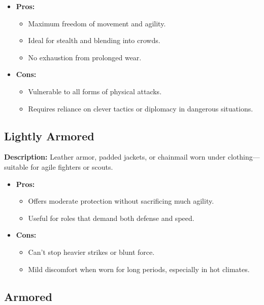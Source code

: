 \documentclass[12pt]{book}  %
\begin{document}
\begin{itemize}
    \item \textbf{Pros:}
    \begin{itemize}
        \item Maximum freedom of movement and agility.
        \item Ideal for stealth and blending into crowds.
        \item No exhaustion from prolonged wear.
    \end{itemize}
    \item \textbf{Cons:}
    \begin{itemize}
        \item Vulnerable to all forms of physical attacks.
        \item Requires reliance on clever tactics or diplomacy in dangerous situations.
    \end{itemize}
\end{itemize}

\subsection*{Lightly Armored}

\textbf{Description:} Leather armor, padded jackets, or chainmail worn under clothing—suitable for agile fighters or scouts.

\begin{itemize}
    \item \textbf{Pros:}
    \begin{itemize}
        \item Offers moderate protection without sacrificing much agility.
        \item Useful for roles that demand both defense and speed.
    \end{itemize}
    \item \textbf{Cons:}
    \begin{itemize}
        \item Can’t stop heavier strikes or blunt force.
        \item Mild discomfort when worn for long periods, especially in hot climates.
    \end{itemize}
\end{itemize}

\subsection*{Armored}
\end{document}
